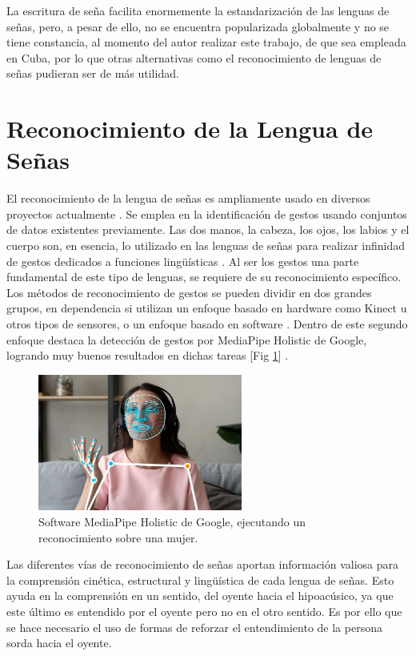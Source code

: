 La escritura de seña facilita enormemente la estandarización de las lenguas de señas, pero, a pesar de ello, no se encuentra popularizada globalmente y no se tiene constancia, al momento del autor realizar este trabajo, de que sea empleada en Cuba, por lo que otras alternativas como el reconocimiento de lenguas de señas pudieran ser de más utilidad.

\section{Reconocimiento de la Lengua de Señas}\label{section:state-of-the-art:slr}
El reconocimiento de la lengua de señas es ampliamente usado en diversos proyectos actualmente . Se emplea en la identificación de gestos usando conjuntos de datos existentes
previamente. Las dos manos, la cabeza, los ojos, los
labios y el cuerpo  son, en esencia, lo utilizado en las lenguas de señas para realizar infinidad de gestos dedicados a funciones lingüísticas . Al ser los gestos una parte fundamental de este tipo de lenguas, se requiere de su reconocimiento específico. Los métodos de reconocimiento de gestos se pueden dividir en dos grandes grupos, en dependencia si utilizan un enfoque basado en hardware como Kinect u otros tipos de sensores, o un enfoque basado en software . Dentro de este segundo enfoque destaca la detección de gestos por MediaPipe Holistic de Google, logrando muy buenos resultados en dichas tareas  [Fig \ref{fig:mediapipe}] .


\begin{figure}[ht!]
    \centering
    \includegraphics[width=0.6\textwidth]{Graphics/mediapipe.png}
    \caption{Software MediaPipe Holistic de Google, ejecutando un reconocimiento sobre una mujer.}
    \label{fig:mediapipe}
\end{figure}

Las diferentes vías de reconocimiento de señas aportan información valiosa para la comprensión cinética, estructural y lingüística de cada lengua de señas. Esto ayuda en la comprensión en un sentido, del oyente hacia el hipoacúsico, ya que este último es entendido por el oyente pero no en el otro sentido. Es por ello que se hace necesario el uso de formas de reforzar el entendimiento de la persona sorda hacia el oyente.


